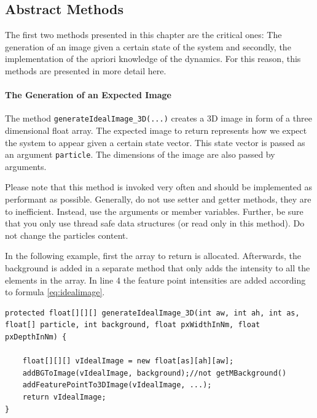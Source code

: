 \documentclass{scrartcl}
\begin{document}
\subsection{Abstract Methods}
\label{sec:abstractmethods}
The first two methods presented in this chapter are the critical ones: The generation of an image given a certain state of the system and secondly, the implementation of the apriori knowledge of the dynamics. For this reason, this methods are presented in more detail here.

\paragraph{The Generation of an Expected Image} The method \texttt{generateIdealImage\_3D(...)} creates a 3D image in form of a three dimensional float array. The expected image to return represents how we expect the system to appear given a certain state vector. This state vector is passed as an argument \texttt{particle}. The dimensions of the image are also passed by arguments. 

Please note that this method is invoked very often and should be implemented as performant as possible. Generally, do not use setter and getter methods, they are to inefficient. Instead, use the arguments or member variables. Further, be sure that you only use thread safe data structures (or read only in this method). Do not change the particles content. 

In the following example, first the array to return is allocated. Afterwards, the background is added in a separate method that only adds the intensity to all the elements in the array. In line 4 the feature point intensities are added according to formula \ref{eq:idealimage}. 
\begin{lstlisting}
protected float[][][] generateIdealImage_3D(int aw, int ah, int as, float[] particle, int background, float pxWidthInNm, float pxDepthInNm) {

	float[][][] vIdealImage = new float[as][ah][aw];
	addBGToImage(vIdealImage, background);//not getMBackground()
	addFeaturePointTo3DImage(vIdealImage, ...);
	return vIdealImage;
}
\end{lstlisting}
\end{document}
